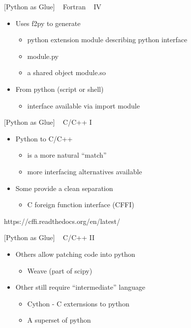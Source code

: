 \documentclass{article}
\begin{document}
    {[}Python as Glue{]} ~ Fortran ~ IV

\begin{itemize}
\itemsep1pt\parskip0pt
\item
  Uses f2py to generate

  \begin{itemize}
  \itemsep1pt\parskip0pt
  \item
    python extension module describing python interface
  \item
    module.py
  \item
    a shared object module.so
  \end{itemize}
\item
  From python (script or shell)

  \begin{itemize}
  \itemsep1pt\parskip0pt
  \item
    interface available via import module
  \end{itemize}
\end{itemize}

    {[}Python as Glue{]} ~ C/C++ I

\begin{itemize}
\itemsep1pt\parskip0pt
\item
  Python to C/C++

  \begin{itemize}
  \itemsep1pt\parskip0pt
  \item
    is a more natural ``match''
  \item
    more interfacing alternatives available
  \end{itemize}
\item
  Some provide a clean separation

  \begin{itemize}
  \itemsep1pt\parskip0pt
  \item
    C foreign function interface (CFFI)
  \end{itemize}
\end{itemize}

https://cffi.readthedocs.org/en/latest/

    {[}Python as Glue{]} ~ C/C++ II

\begin{itemize}
\itemsep1pt\parskip0pt
\item
  Others allow patching code into python

  \begin{itemize}
  \itemsep1pt\parskip0pt
  \item
    Weave (part of scipy)
  \end{itemize}
\item
  Other still require ``intermediate'' language

  \begin{itemize}
  \itemsep1pt\parskip0pt
  \item
    Cython - C externsions to python
  \item
    A superset of python
  \end{itemize}
\end{itemize}
\end{document}

